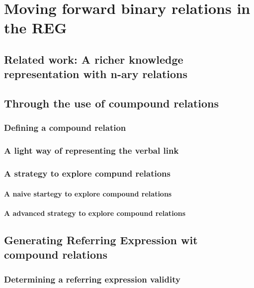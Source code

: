 \ifdefined{}
\else
\setcounter{chapter}{7} %
\dominitoc
\faketableofcontents
\fi

\chapter{Moving forward binary relations in the REG}
\minitoc

\section{Related work: A richer knowledge representation with n-ary relations}

\section{Through the use of coumpound relations}

\subsection{Defining a compound relation}

\subsection{A light way of representing the verbal link}

\subsection{A strategy to explore compund relations}

\subsubsection{A naive startegy to explore compound relations}

\subsubsection{A advanced strategy to explore compound relations}


\section{Generating Referring Expression wit compound relations}

\subsection{Determining a referring expression validity}

